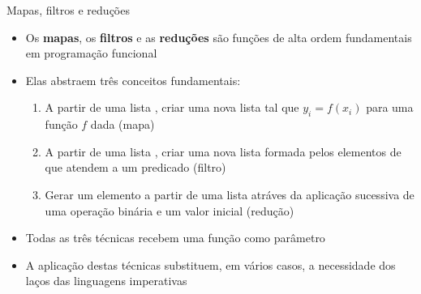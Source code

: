 \begin{frame}[fragile]{Mapas, filtros e reduções}

    \begin{itemize}
        \item Os \textbf{mapas}, os \textbf{filtros} e as \textbf{reduções} são funções de alta 
            ordem fundamentais em programação funcional

        \item Elas abstraem três conceitos fundamentais:
        \begin{enumerate}
            \item A partir de uma lista , criar uma nova lista 
                tal que $y_i = f(x_i)$ para uma função $f$ dada (mapa)

            \item A partir de uma lista , criar uma nova lista 
                formada pelos elementos  de  que atendem a um
                predicado  (filtro)

            \item Gerar um elemento  a partir de uma lista 
                atráves da aplicação sucessiva de uma operação binária  e um
                valor inicial  (redução)
        \end{enumerate}

        \item Todas as três técnicas recebem uma função como parâmetro

        \item A aplicação destas técnicas substituem, em vários casos, a necessidade dos laços das
            linguagens imperativas
    \end{itemize}

\end{frame}

